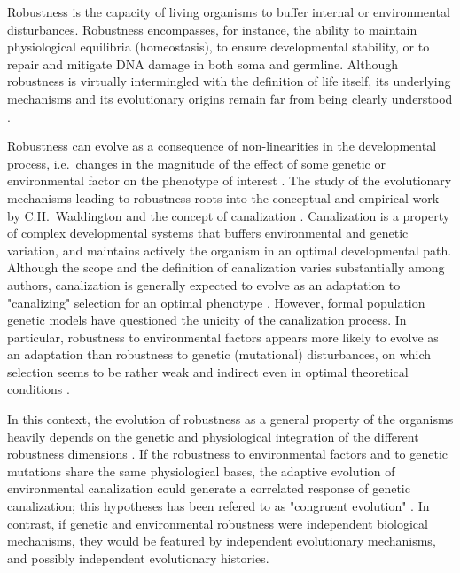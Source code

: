 \documentclass[10pt,a4paper]{article}
\begin{document}
Robustness is the capacity of living organisms to buffer internal or environmental disturbances. Robustness encompasses, for instance, the ability to maintain physiological equilibria (homeostasis), to ensure developmental stability, or to repair and mitigate DNA damage in both soma and germline. Although robustness is virtually intermingled with the definition of life itself, its underlying mechanisms and its evolutionary origins remain far from being clearly understood \citep{Ste02,MS09,Wag13,HGK+19}. 

Robustness can evolve as a consequence of non-linearities in the developmental process, i.e.\ changes in the magnitude of the effect of some genetic or environmental factor on the phenotype of interest \citep{Nij02}. The study of the evolutionary mechanisms leading to robustness roots into the conceptual and empirical work by C.H.\ Waddington and the concept of canalization \citep{Wad42,Sch49,Wad59,Loi19}. Canalization is a property of complex developmental systems that buffers environmental and genetic variation, and maintains actively the organism in an optimal developmental path. Although the scope and the definition of canalization varies substantially among authors, canalization is generally expected to evolve as an adaptation to "canalizing" selection for an optimal phenotype \citep{EM98,DD01,Fla05,Kli19}. However, formal population genetic models have questioned the unicity of the canalization process. In particular, robustness to environmental factors appears more likely to evolve as an adaptation than robustness to genetic (mutational) disturbances, on which selection seems to be rather weak and indirect even in optimal theoretical conditions \citep{WBB97, HHW03,LAH13}. 

In this context, the evolution of robustness as a general property of the organisms heavily depends on the genetic and physiological integration of the different robustness dimensions \citep{Far15}. If the robustness to environmental factors and to genetic mutations share the same physiological bases, the adaptive evolution of environmental canalization could generate a correlated response of genetic canalization; this hypotheses has been refered to as "congruent evolution" \citep{dHW+03}. In contrast, if genetic and environmental robustness were independent biological mechanisms, they would be featured by independent evolutionary mechanisms, and possibly independent evolutionary histories. 
\end{document}

